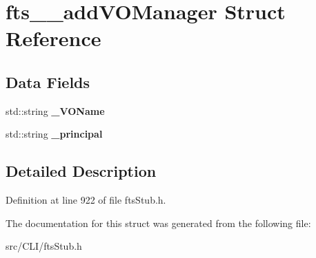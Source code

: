 \section{fts\_\-\_\-addVOManager Struct Reference}
\label{structfts____addVOManager}
\subsection*{Data Fields}
\begin{DoxyCompactItemize}
\item 
std::string {\bfseries \_\-VOName}\label{structfts____addVOManager_ad4da4913364cb6cc236d038e08052c48}

\item 
std::string {\bfseries \_\-principal}\label{structfts____addVOManager_a63d34a35fa36b243ce81f138ed3eb179}

\end{DoxyCompactItemize}


\subsection{Detailed Description}


Definition at line 922 of file ftsStub.h.



The documentation for this struct was generated from the following file:\begin{DoxyCompactItemize}
\item 
src/CLI/ftsStub.h\end{DoxyCompactItemize}
